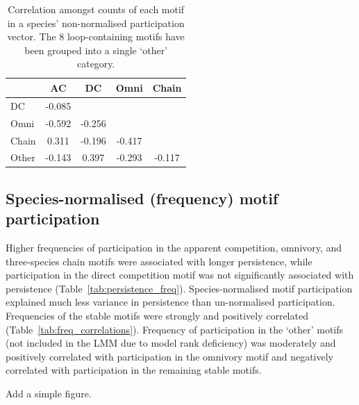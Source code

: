 \documentclass[12pt]{article}
\begin{document}
\begin{spacing}{2.0}
		\begin{table}[h!]
		\caption{Correlation amongst counts of each motif in a species' non-normalised participation vector. The 8 loop-containing motifs have been grouped into a single `other' category.}
		\label{tab:count_correlations}
		\begin{tabular}{l | c c c c}
			& AC & DC & Omni & Chain \\
		\hline
		DC    & -0.085 &        &        &        \\   
		Omni  & -0.592 & -0.256 &        &        \\
		Chain &  0.311 & -0.196 & -0.417 &        \\
		Other & -0.143 &  0.397 & -0.293 & -0.117 \\
		\hline
		\end{tabular}
		\end{table}

	\subsection*{Species-normalised (frequency) motif participation}


		Higher frequencies of participation in the apparent competition, omnivory, and three-species chain motifs were associated with longer persistence, while participation in the direct competition motif was not significantly associated with persistence (Table~\ref{tab:persistence_freq}).
		Species-normalised motif participation explained much less variance in persistence than un-normalised participation.
		Frequencies of the stable motifs were strongly and positively correlated (Table~\ref{tab:freq_correlations}).
		Frequency of participation in the `other' motifs (not included in the LMM due to model rank deficiency) was moderately and positively correlated with participation in the omnivory motif and negatively correlated with participation in the remaining stable motifs.


		Add a simple figure.



\end{spacing}
\end{document}
